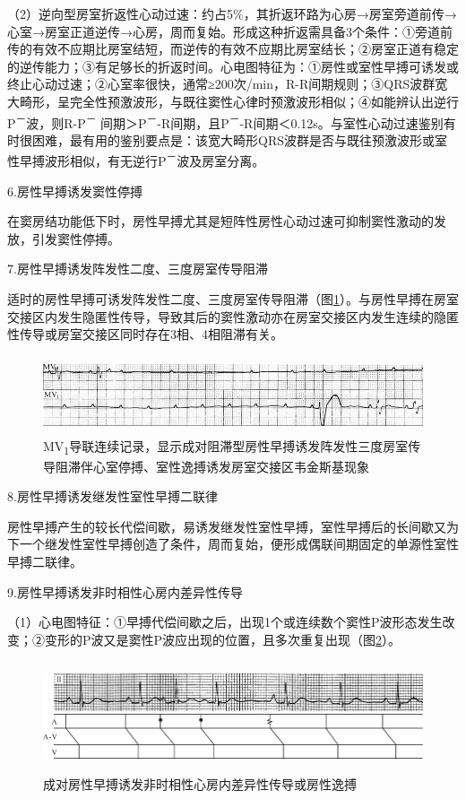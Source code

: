 （2）逆向型房室折返性心动过速：约占5\%，其折返环路为心房→房室旁道前传→心室→房室正道逆传→心房，周而复始。形成这种折返需具备3个条件：①旁道前传的有效不应期比房室结短，而逆传的有效不应期比房室结长；②房室正道有稳定的逆传能力；③有足够长的折返时间。心电图特征为：①房性或室性早搏可诱发或终止心动过速；②心室率很快，通常≥200次/min，R-R间期规则；③QRS波群宽大畸形，呈完全性预激波形，与既往窦性心律时预激波形相似；④如能辨认出逆行P\textsuperscript{－}波，则R-P\textsuperscript{－} 间期＞P\textsuperscript{－}-R间期，且P\textsuperscript{－}-R间期＜0.12s。与室性心动过速鉴别有时很困难，最有用的鉴别要点是：该宽大畸形QRS波群是否与既往预激波形或室性早搏波形相似，有无逆行P\textsuperscript{－}波及房室分离。

6.房性早搏诱发窦性停搏

在窦房结功能低下时，房性早搏尤其是短阵性房性心动过速可抑制窦性激动的发放，引发窦性停搏。

7.房性早搏诱发阵发性二度、三度房室传导阻滞

适时的房性早搏可诱发阵发性二度、三度房室传导阻滞（图\ref{fig11-14}）。与房性早搏在房室交接区内发生隐匿性传导，导致其后的窦性激动亦在房室交接区内发生连续的隐匿性传导或房室交接区同时存在3相、4相阻滞有关。

\begin{figure}[!htbp]
 \centering
 \includegraphics[width=5.5625in,height=0.90625in]{./images/Image00174.jpg}
 \captionsetup{justification=centering}
 \caption{MV\textsubscript{1}导联连续记录，显示成对阻滞型房性早搏诱发阵发性三度房室传导阻滞伴心室停搏、室性逸搏诱发房室交接区韦金斯基现象}
 \label{fig11-14}
  \end{figure} 


8.房性早搏诱发继发性室性早搏二联律

房性早搏产生的较长代偿间歇，易诱发继发性室性早搏，室性早搏后的长间歇又为下一个继发性室性早搏创造了条件，周而复始，便形成偶联间期固定的单源性室性早搏二联律。

9.房性早搏诱发非时相性心房内差异性传导

（1）心电图特征：①早搏代偿间歇之后，出现1个或连续数个窦性P波形态发生改变；②变形的P波又是窦性P波应出现的位置，且多次重复出现（图\ref{fig11-15}）。

\begin{figure}[!htbp]
 \centering
 \includegraphics[width=5.75in,height=1.28125in]{./images/Image00175.jpg}
 \captionsetup{justification=centering}
 \caption{成对房性早搏诱发非时相性心房内差异性传导或房性逸搏}
 \label{fig11-15}
  \end{figure} 

